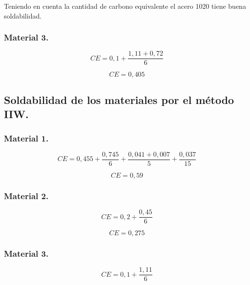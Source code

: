 \documentclass[12pt,a4paper]{article}
\begin{document}
Teniendo en cuenta la cantidad de carbono equivalente el acero 1020 tiene buena soldabilidad.

\subsubsection{Material 3.}

\begin{equation*}
    CE = 0,1 + \frac{1,11 + 0,72}{6} 
\end{equation*}

\begin{equation*}
    CE = 0,405
\end{equation*}

\subsection{Soldabilidad de los materiales por el método IIW.}

\subsubsection{Material 1.}

\begin{equation*}
    CE = 0,455 + \frac{0,745}{6} + \frac{0,041 + 0,007}{5} + \frac{0,037}{15}
\end{equation*}

\begin{equation*}
    CE = 0,59
\end{equation*}

\subsubsection{Material 2.}

\begin{equation*}
    CE = 0,2 + \frac{0,45}{6} 
\end{equation*}

\begin{equation*}
    CE = 0,275
\end{equation*}

\subsubsection{Material 3.}

\begin{equation*}
    CE = 0,1 + \frac{1,11}{6} 
\end{equation*}
\end{document}
